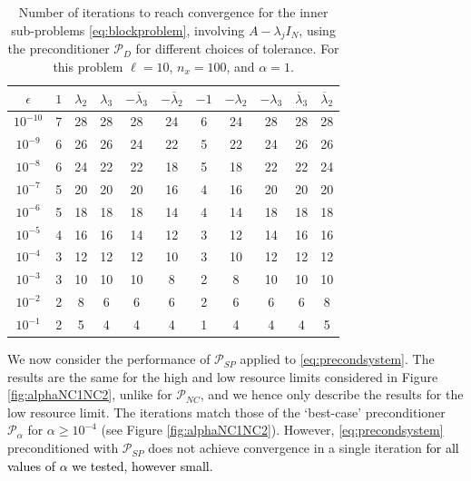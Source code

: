 \documentclass{article}
\newcommand{\aw}{\textcolor{black}}%
\newcommand{\sizeA}{N}
\theoremstyle{definition}
\begin{document}
{		
		\begin{table}[htb]
			\centering
			\begin{tabular}{c|cccccccccc}
				$\epsilon$  &   $1$ & $\lambda_2$ & $\lambda_3$ & $-\overline{\lambda}_3$& $-\overline{\lambda}_2$ &$  -1$& $-\lambda_2$ & $-\lambda_3$ & $\overline{\lambda}_3$ & $\overline{\lambda}_2$ \\
				\hline
				$10^{-10}$ & 7   & 28 &   28 &   28  &  24 &    6 &   24 &   28 &   28 &   28\\
				$10^{-9}$&6   & 26  &  26   & 24  &  22  &   5  &  22  &  24  &  26  &  26\\
				$10^{-8}$&6   & 24  &  22  &  22 &   18  &   5   & 18  &  22  &  22  &  24\\
				$10^{-7}$& 5  &  20  &  20  &  20  &  16  &   4  &  16 &   20 &   20 &   20\\
				$10^{-6}$& 5   & 18   & 18  &  18  &  14  &   4  &  14 &   18   & 18  &  18\\
				$10^{-5}$&   4  &  16 &   16 &   14 &   12 &    3 &   12&    14  &  16 &   16\\
				$10^{-4}$& 3   & 12   & 12  &  12  &  10  &   3   & 10  &  12   & 12  &  12\\
				$10^{-3}$&  3  &  10  &  10 &   10  &   8  &   2  &   8 &   10  &  10 &   10\\
				$10^{-2}$& 2   &  8   &  6  &   6  &   6   &  2   &  6   &  6   &  6   &  8\\
				$10^{-1}$&   2  &   5 &    4  &   4  &   4  &   1 &    4  &   4  &   4  &   5
			\end{tabular}
			\caption{Number of iterations to reach convergence for the inner sub-problems \eqref{eq:blockproblem}, involving $A-\lambda_j I_\sizeA$, using the preconditioner $\mathcal{P}_{D}$ for different choices of tolerance. For this problem $\ell=10$, $n_x=100$, and $\alpha = 1$.}
			\label{tab:SP conv tol}
		\end{table}
		
		
		We now consider the performance of $\mathcal{P}_{SP}$ applied to \eqref{eq:precondsystem}. 
		{The results are the same} for the high and low resource limits considered in Figure \ref{fig:alphaNC1NC2}, unlike for $\mathcal{P}_{NC}$, and we hence only describe the results for the low resource limit. The iterations match those of the `best-case' preconditioner $\mathcal{P}_{\alpha}$ for $\alpha \ge 10^{-4}$ (see Figure \ref{fig:alphaNC1NC2}). However,  \eqref{eq:precondsystem} preconditioned with $\mathcal{P}_{SP}$  does not achieve convergence in a single iteration \aw{for all values of $\alpha$ we tested, however small}. 
		
}
\end{document}
